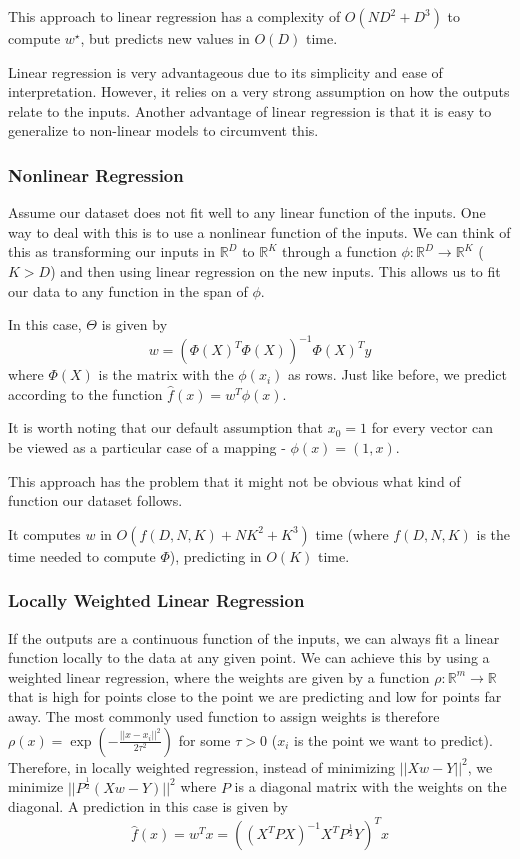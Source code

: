 \documentclass{article}
\newcommand{\R}{\mathbb{R}}
\begin{document}
This approach to linear regression has a complexity of $O(ND^2 + D^3)$ to compute $w^\star$, but predicts new values in $O(D)$ time.

Linear regression is very advantageous due to its simplicity and ease of interpretation.
However, it relies on a very strong assumption on how the outputs relate to the inputs.
Another advantage of linear regression is that it is easy to generalize to non-linear models to circumvent this.

\subsubsection{Nonlinear Regression}

Assume our dataset does not fit well to any linear function of the inputs. 
One way to deal with this is to use a nonlinear function of the inputs.
We can think of this as transforming our inputs in $\R^D$ to $\R^K$ through a function $\phi: \R^D \to \R^K$ ($K > D$) and then using linear regression on the new inputs.
This allows us to fit our data to any function in the span of $\phi$.

In this case, $\Theta$ is given by
$$
w = (\Phi(X)^T \Phi(X))^{-1} \Phi(X)^T y
$$
where $\Phi(X)$ is the matrix with the $\phi(x_i)$ as rows.
Just like before, we predict according to the function $\hat{f}(x) = w^T \phi(x)$.

It is worth noting that our default assumption that $x_0 = 1$ for every vector can be viewed as a particular case of a mapping - $\phi(x) = (1, x)$.

This approach has the problem that it might not be obvious what kind of function our dataset follows.

It computes $w$ in $O(f(D,N,K) + NK^2 + K^3)$ time (where $f(D,N,K)$ is the time needed to compute $\Phi$), predicting in $O(K)$ time.

\subsubsection{Locally Weighted Linear Regression}

If the outputs are a continuous function of the inputs, we can always fit a linear function locally to the data at any given point.
We can achieve this by using a weighted linear regression, where the weights are given by a function $\rho: \R^m \to \R$ that is high for points close to the point we are predicting and low for points far away.
The most commonly used function to assign weights is therefore $\rho(x) = \exp(-\frac{||x - x_i||^2}{2\tau^2})$ for some $\tau > 0$ ($x_i$ is the point we want to predict).
Therefore, in locally weighted regression, instead of minimizing $||X w - Y||^2$, we minimize $||P^{\frac{1}{2}}(X w - Y)||^2$ where $P$ is a diagonal matrix with the weights on the diagonal.
A prediction in this case is given by
$$
\hat{f}(x) = w^T x = ((X^T P X)^{-1} X^T P^{\frac{1}{2}} Y)^T x
$$
\end{document}
